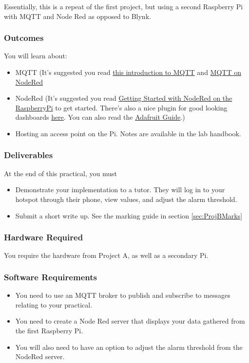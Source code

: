 Essentially, this is a repeat of the first project, but using a second Raspberry Pi with MQTT and Node Red as opposed to Blynk.

\subsubsection{Outcomes}
You will learn about:
\begin{itemize}
    \item MQTT (It's suggested you read \href{https://randomnerdtutorials.com/what-is-mqtt-and-how-it-works/}{this introduction to MQTT} and \href{https://cookbook.nodered.org/mqtt/}{MQTT on NodeRed}
    \item NodeRed (It's suggested you read \href{https://nodered.org/docs/getting-started/raspberrypi}{Getting Started with NodeRed on the RaspberryPi} to get started. There's also a nice plugin for good looking dashboards \href{https://flows.nodered.org/node/node-red-dashboard}{here}. You can also read the \href{https://learn.adafruit.com/raspberry-pi-hosting-node-red}{Adafruit Guide}.)
    \item Hosting an access point on the Pi. Notes are available in the lab handbook. 
\end{itemize}

\subsubsection{Deliverables}
At the end of this practical, you must
\begin{itemize}
    \item Demonstrate your implementation to a tutor. They will log in to your hotspot through their phone, view values, and adjust the alarm threshold.
    \item Submit a short write up. See the marking guide in section \ref{sec:ProjBMarks}
\end{itemize}

\subsubsection{Hardware Required}
You require the hardware from Project A, as well as a secondary Pi.

\subsubsection{Software Requirements}
\begin{itemize}
    \item You need to use an MQTT broker to publish and subscribe to messages relating to your practical. 
    \item You need to create a Node Red server that displays your data gathered from the first Raspberry Pi. 
    \item You will also need to have an option to adjust the alarm threshold from the NodeRed server.
\end{itemize}

